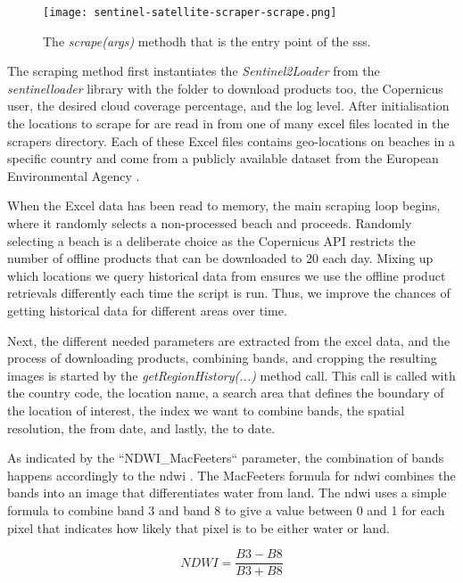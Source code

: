 \begin{figure}[h!]
    \centering
    \texttt{[image: sentinel-satellite-scraper-scrape.png]}
    \caption{The \emph{scrape(args)} methodh that is the entry point of the \acrshort{sss}.}
    \label{fig:sentinel-satellite-scraper-scrape}
\end{figure}

The scraping method first instantiates the \emph{Sentinel2Loader} from the \emph{sentinelloader} library with the folder to download products too, the Copernicus user, the desired cloud coverage percentage, and the log level. After initialisation the locations to scrape for are read in from one of many excel files located in the scrapers directory. Each of these Excel files contains geo-locations on beaches in a specific country and come from a publicly available dataset from the European Environmental Agency \cite{bathing_dateset}. 

When the Excel data has been read to memory, the main scraping loop begins, where it randomly selects a non-processed beach and proceeds. Randomly selecting a beach is a deliberate choice as the Copernicus API restricts the number of offline products that can be downloaded to 20 each day. Mixing up which locations we query historical data from ensures we use the offline product retrievals differently each time the script is run. Thus, we improve the chances of getting historical data for different areas over time.

Next, the different needed parameters are extracted from the excel data, and the process of downloading products, combining bands, and cropping the resulting images is started by the \emph{getRegionHistory(...)} method call. This call is called with the country code, the location name, a search area that defines the boundary of the location of interest, the index we want to combine bands, the spatial resolution, the from date, and lastly, the to date.

As indicated by the ``NDWI\_MacFeeters`` parameter, the combination of bands happens accordingly to the \acrfull{ndwi} \cite{ndwi}. The MacFeeters formula for \acrshort{ndwi} combines the bands into an image that differentiates water from land. The \acrshort{ndwi} uses a simple formula to combine band 3 and band 8 to give a value between 0 and 1 for each pixel that indicates how likely that pixel is to be either water or land. \cite{sentinel-2-bands-combinations}

\[ NDWI = \dfrac{B3 - B8}{B3 + B8} \]

